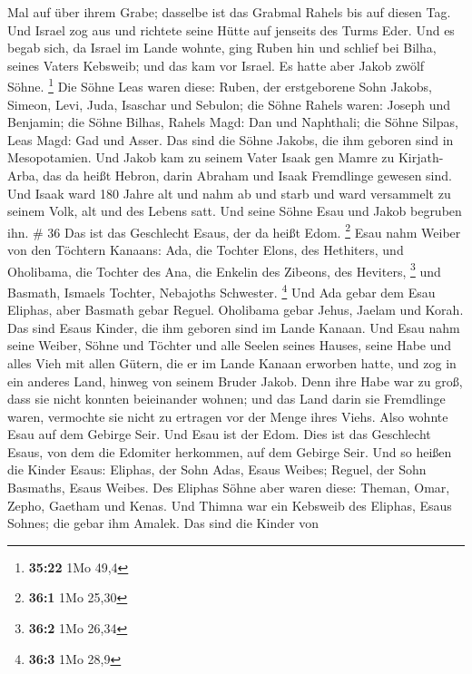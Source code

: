 Mal auf über ihrem Grabe; dasselbe ist das Grabmal Rahels bis auf diesen
Tag.  Und Israel zog aus und richtete seine Hütte auf
jenseits des Turms Eder.  Und es begab sich, da Israel im
Lande wohnte, ging Ruben hin und schlief bei Bilha, seines Vaters
Kebsweib; und das kam vor Israel. Es hatte aber Jakob zwölf Söhne.
\footnote{\textbf{35:22} 1Mo 49,4}  Die Söhne Leas waren
diese: Ruben, der erstgeborene Sohn Jakobs, Simeon, Levi, Juda, Isaschar
und Sebulon;  die Söhne Rahels waren: Joseph und
Benjamin;  die Söhne Bilhas, Rahels Magd: Dan und
Naphthali;  die Söhne Silpas, Leas Magd: Gad und Asser.
Das sind die Söhne Jakobs, die ihm geboren sind in Mesopotamien.
 Und Jakob kam zu seinem Vater Isaak gen Mamre zu
Kirjath-Arba, das da heißt Hebron, darin Abraham und Isaak Fremdlinge
gewesen sind.  Und Isaak ward 180 Jahre alt
 und nahm ab und starb und ward versammelt zu seinem
Volk, alt und des Lebens satt. Und seine Söhne Esau und Jakob begruben
ihn. \# 36  Das ist das Geschlecht Esaus, der da heißt
Edom. \footnote{\textbf{36:1} 1Mo 25,30}  Esau nahm Weiber
von den Töchtern Kanaans: Ada, die Tochter Elons, des Hethiters, und
Oholibama, die Tochter des Ana, die Enkelin des Zibeons, des Heviters,
\footnote{\textbf{36:2} 1Mo 26,34}  und Basmath, Ismaels
Tochter, Nebajoths Schwester. \footnote{\textbf{36:3} 1Mo 28,9}
 Und Ada gebar dem Esau Eliphas, aber Basmath gebar
Reguel.  Oholibama gebar Jehus, Jaelam und Korah. Das sind
Esaus Kinder, die ihm geboren sind im Lande Kanaan.  Und
Esau nahm seine Weiber, Söhne und Töchter und alle Seelen seines Hauses,
seine Habe und alles Vieh mit allen Gütern, die er im Lande Kanaan
erworben hatte, und zog in ein anderes Land, hinweg von seinem Bruder
Jakob.  Denn ihre Habe war zu groß, dass sie nicht konnten
beieinander wohnen; und das Land darin sie Fremdlinge waren, vermochte
sie nicht zu ertragen vor der Menge ihres Viehs.  Also
wohnte Esau auf dem Gebirge Seir. Und Esau ist der Edom. 
Dies ist das Geschlecht Esaus, von dem die Edomiter herkommen, auf dem
Gebirge Seir.  Und so heißen die Kinder Esaus: Eliphas,
der Sohn Adas, Esaus Weibes; Reguel, der Sohn Basmaths, Esaus Weibes.
 Des Eliphas Söhne aber waren diese: Theman, Omar, Zepho,
Gaetham und Kenas.  Und Thimna war ein Kebsweib des
Eliphas, Esaus Sohnes; die gebar ihm Amalek. Das sind die Kinder von
